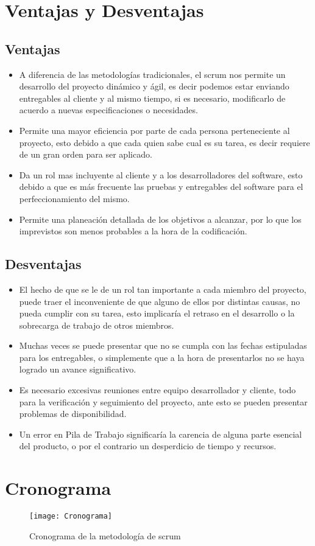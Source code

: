 \section{Ventajas y Desventajas}

\subsection{Ventajas}

\begin{itemize}
\item A diferencia de las metodologías tradicionales, el scrum nos permite un desarrollo del proyecto dinámico y ágil, es decir podemos estar enviando entregables al cliente y al mismo tiempo, si es necesario, modificarlo de acuerdo a nuevas especificaciones o necesidades.

\item Permite una mayor eficiencia por parte de cada persona perteneciente al proyecto, esto debido a que cada quien sabe cual es su tarea, es decir requiere de un gran orden para ser aplicado.

\item Da un rol mas incluyente al cliente y a los desarrolladores del software, esto debido a que es más frecuente las pruebas y entregables del software para el perfeccionamiento del mismo.

\item Permite una planeación detallada de los objetivos a alcanzar, por lo que los imprevistos son menos probables a la hora de la codificación. 
\end{itemize} 
\subsection{Desventajas}

\begin{itemize}
\item El hecho de que se le de un rol tan importante a cada miembro del proyecto, puede traer el inconveniente de que alguno de ellos por distintas causas, no pueda cumplir con su tarea, esto implicaría el retraso en el desarrollo o la sobrecarga de trabajo de otros miembros.

\item Muchas veces se puede presentar que no se cumpla con las fechas estipuladas para los entregables, o simplemente que a la hora de presentarlos no se haya logrado un avance significativo.

\item Es necesario excesivas reuniones entre equipo desarrollador y cliente, todo para la verificación y seguimiento del proyecto, ante esto se pueden presentar problemas de disponibilidad.

\item Un error en Pila de Trabajo significaría la carencia de alguna parte esencial del producto, o por el contrario un desperdicio de tiempo y recursos.
\end{itemize} 
\newpage
\section{Cronograma}
\begin{figure}[th!]
	\centering
	\texttt{[image: Cronograma]}
    \caption{Cronograma de la metodología de scrum}
	\label{fig:Cronograma}
\end{figure}